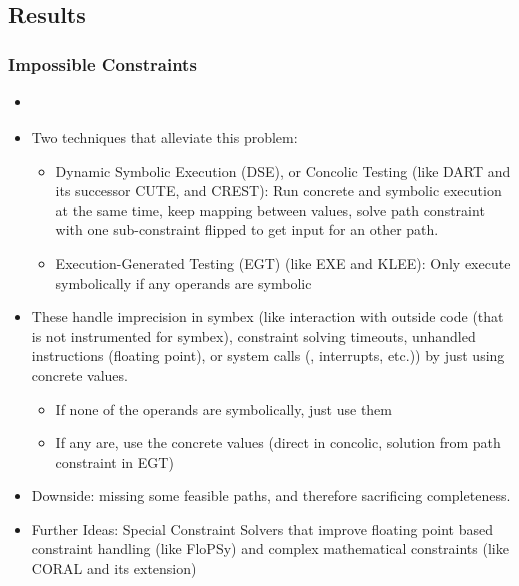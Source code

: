 \documentclass{article}
\begin{document}
\subsection{Results}
\subsubsection{Impossible Constraints}
\begin{itemize}
  \item {}\cite{ReviewThreeDecades}
  \item Two techniques that alleviate this problem:
        \begin{itemize}
          \item Dynamic Symbolic Execution (DSE), or Concolic Testing (like DART\cite{DART} and its successor CUTE\cite{CUTE}, and CREST\cite{CREST}): Run concrete and symbolic execution at the same time, keep mapping between values, solve path constraint with one sub-constraint flipped to get input for an other path. \cite{PreliminaryAssessment}
          \item Execution-Generated Testing (EGT)\cite{EGT} (like EXE\cite{EXE} and KLEE\cite{KLEE}): Only execute symbolically if any operands are symbolic
        \end{itemize}
  \item These handle imprecision in symbex (like interaction with outside code (that is not instrumented for symbex), constraint solving timeouts, unhandled instructions (floating point), or system calls (, interrupts, etc.)) by just using concrete values.
        \begin{itemize}
          \item If none of the operands are symbolically, just use them
          \item If any are, use the concrete values (direct in concolic, solution from path constraint in EGT)
        \end{itemize}
  \item Downside: missing some feasible paths, and therefore sacrificing completeness.
  \item Further Ideas: Special Constraint Solvers that improve floating point based constraint handling (like FloPSy\cite{FloPSy}) and complex mathematical constraints (like CORAL\cite{CORAL} and its extension\cite{CORALAVM})
\end{itemize}
\end{document}
